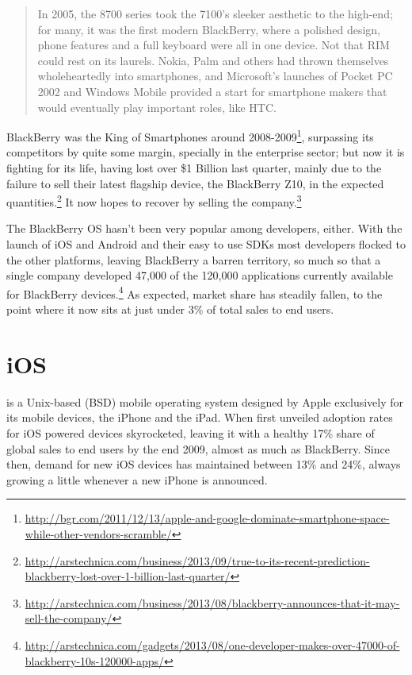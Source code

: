\begin{quotation}
In 2005, the 8700 series took the 7100's sleeker aesthetic to the high-end; for many, it was the first modern BlackBerry, where a polished design, phone features and a full keyboard were all in one device. Not that RIM could rest on its laurels. Nokia, Palm and others had thrown themselves wholeheartedly into smartphones, and Microsoft's launches of Pocket PC 2002 and Windows Mobile provided a start for smartphone makers that would eventually play important roles, like HTC.
\cite{fingas:2013}
\end{quotation}


BlackBerry was the King of Smartphones around 2008-2009\footnote{\url{http://bgr.com/2011/12/13/apple-and-google-dominate-smartphone-space-while-other-vendors-scramble/}}, surpassing its competitors by quite some margin, specially in the enterprise sector; but now it is fighting for its life, having lost over \$1 Billion last quarter, mainly due to the failure to sell their latest flagship device, the BlackBerry Z10, in the expected quantities.\footnote{\url{http://arstechnica.com/business/2013/09/true-to-its-recent-prediction-blackberry-lost-over-1-billion-last-quarter/}} It now hopes to recover by selling the company.\footnote{\url{http://arstechnica.com/business/2013/08/blackberry-announces-that-it-may-sell-the-company/}}


The BlackBerry OS hasn't been very popular among developers, either. With the launch of iOS and Android and their easy to use SDKs most developers flocked to the other platforms, leaving BlackBerry a barren territory, so much so that a single company developed 47,000 of the 120,000 applications currently available for BlackBerry devices.\footnote{\url{http://arstechnica.com/gadgets/2013/08/one-developer-makes-over-47000-of-blackberry-10s-120000-apps/}} As expected, market share has steadily fallen, to the point where it now sits at just under 3\% of total sales to end users.
  

\section{iOS}
 is a Unix-based (BSD) mobile operating system designed by Apple exclusively for its mobile devices, the iPhone\textregistered{} and the iPad\textregistered. When first unveiled adoption rates for iOS powered devices skyrocketed, leaving it with a healthy 17\% share of global sales to end users by the end 2009, almost as much as BlackBerry. Since then, demand for new iOS devices has maintained between 13\% and 24\%, always growing a little whenever a new iPhone is announced.

